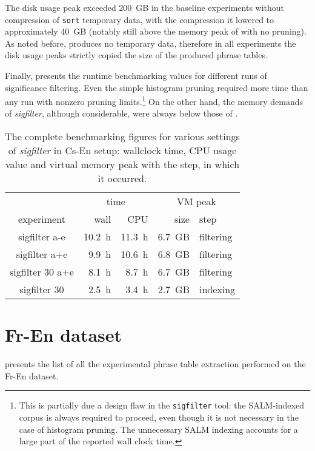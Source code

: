 The disk usage peak exceeded 200~GB in the baseline experiments without compression of
\texttt{sort} temporary data, with the compression it lowered to approximately 40~GB
(notably still above the memory peak of \eppex{} with no pruning).
As noted before, \eppex{} produces no temporary data, therefore in all experiments the
disk usage peaks strictly copied the size of the produced phrase tables.

Finally,  presents the runtime benchmarking
values for different runs of significance filtering.
Even the simple histogram pruning required more time than any \eppex{} run with nonzero
pruning limits.\footnote{This is partially due a design flaw in the \texttt{sigfilter} tool:
the SALM-indexed corpus is always required to proceed, even though it is not necessary in
the case of histogram pruning. The unnecessary SALM indexing accounts for a large part
of the reported wall clock time.}
On the other hand, the memory demands of \emph{sigfilter}, although considerable, were
always below those of \eppex{}.

\begin{table}[ht]
\centering
\begin{tabular}{ | c | r r | r l | }
\hline
 & \multicolumn{2}{|c|}{time} & \multicolumn{2}{|c|}{VM peak} \\
experiment & wall & CPU & size & step \\
\hline
\hline
sigfilter a-e     & 10.2~h & 11.3~h & 6.7~GB & filtering \\
sigfilter a+e     & 9.9~h & 10.6~h & 6.8~GB & filtering \\
sigfilter 30 a+e  & 8.1~h & 8.7~h & 6.7~GB & filtering \\
sigfilter 30      & 2.5~h & 3.4~h & 2.7~GB & indexing \\
\hline
\end{tabular}
\caption{\label{cs-en-wmt13-sigfilter-runtime-benchmarks}
The complete benchmarking figures for various settings of \emph{sigfilter} in Cs-En setup:
wallclock time, CPU usage value and virtual memory peak with the step, in which it occurred.}
\end{table}

\section{Fr-En dataset}
\label{sec:fr-en-results}

 presents the list of all the experimental phrase table extraction
performed on the Fr-En dataset.

